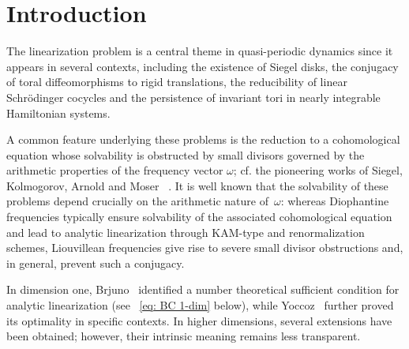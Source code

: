 \documentclass[12pt,reqno,a4paper]{amsart}%
\numberwithin{equation}{section}
\newcommand{\Rr}{{\mathbb{R}}}
\newcommand{\Tt}{{\mathbb{T}}}
\newcommand{\Zz}{{\mathbb{Z}}}
\newcommand{\tcm}{\textcolor{magenta}}
\begin{document}
\section{Introduction}\label{section:Introduction}



The linearization problem is a central theme in quasi-periodic dynamics since it appears in several  contexts, including the existence of Siegel disks, the conjugacy of toral diffeomorphisms to rigid translations, the reducibility of linear Schr\"odinger cocycles and the persistence of invariant tori in nearly integrable Hamiltonian systems. 

A common feature underlying these problems is the reduction to a cohomological equation whose solvability is obstructed by small divisors governed by the arithmetic properties of the frequency vector $\omega$; cf. the pioneering works of Siegel, Kolmogorov, Arnold and Moser ~\cite{Siegel1942,Kolmogorov1954,Arnold1963,Moser1962}.
It is well known that the solvability of these problems  depend crucially on the arithmetic nature of~$\omega$: whereas Diophantine frequencies typically ensure solvability of the associated cohomological equation and lead to analytic linearization through KAM-type and renormalization schemes,
Liouvillean frequencies give rise to severe small divisor obstructions and, in general, prevent such a conjugacy.


%
%
In dimension one, Brjuno~\cite{Brjuno,Brjuno2} identified a number theoretical sufficient condition for analytic linearization (see ~\eqref{eq: BC 1-dim} below), while Yoccoz~\cite{Yoccoz4,Yoccoz2,Yoccoz1995}  further proved its optimality in specific contexts. In higher dimensions, several extensions have been obtained; however, their intrinsic  meaning remains less transparent.
\end{document}
